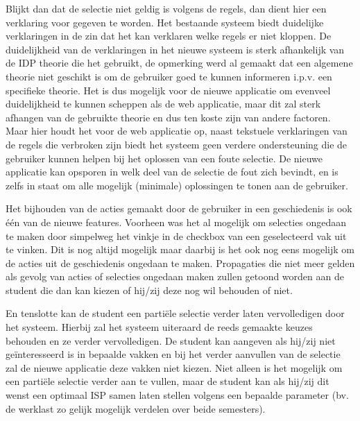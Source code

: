 Blijkt dan dat de selectie niet geldig is volgens de regels, dan dient hier een verklaring voor gegeven te worden. Het bestaande systeem biedt duidelijke verklaringen in de zin dat het kan verklaren welke regels er niet kloppen. De duidelijkheid van de verklaringen in het nieuwe systeem is sterk afhankelijk van de IDP theorie die het gebruikt, de opmerking werd al gemaakt dat een algemene theorie niet geschikt is om de gebruiker goed te kunnen informeren i.p.v. een specifieke theorie. Het is dus mogelijk voor de nieuwe applicatie om evenveel duidelijkheid te kunnen scheppen als de web applicatie, maar dit zal sterk afhangen van de gebruikte theorie en dus ten koste zijn van andere factoren. Maar hier houdt het voor de web applicatie op, naast tekstuele verklaringen van de regels die verbroken zijn biedt het systeem geen verdere ondersteuning die de gebruiker kunnen helpen bij het oplossen van een foute selectie. De nieuwe applicatie kan opsporen in welk deel van de selectie de fout zich bevindt, en is zelfs in staat om alle mogelijk (minimale) oplossingen te tonen aan de gebruiker. 

Het bijhouden van de acties gemaakt door de gebruiker in een geschiedenis is ook \'{e}\'{e}n van de nieuwe features. Voorheen was het al mogelijk om selecties ongedaan te maken door simpelweg het vinkje in de checkbox van een geselecteerd vak uit te vinken. Dit is nog altijd mogelijk maar daarbij is het ook nog eens mogelijk om de acties uit de geschiedenis ongedaan te maken. Propagaties die niet meer gelden als gevolg van acties of selecties ongedaan maken zullen getoond worden aan de student die dan kan kiezen of hij/zij deze nog wil behouden of niet. 

En tenslotte kan de student een parti\"{e}le selectie verder laten vervolledigen door het systeem. Hierbij zal het systeem uiteraard de reeds gemaakte keuzes behouden en ze verder vervolledigen. De student kan aangeven als hij/zij niet ge\"{i}nteresseerd is in bepaalde vakken en bij het verder aanvullen van de selectie zal de nieuwe applicatie deze vakken niet kiezen. Niet alleen is het mogelijk om een parti\"{e}le selectie verder aan te vullen, maar de student kan als hij/zij dit wenst een optimaal ISP samen laten stellen volgens een bepaalde parameter (bv. de werklast zo gelijk mogelijk verdelen over beide semesters). 

